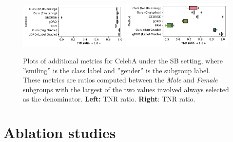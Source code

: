 \begin{figure}[t]
 \includegraphics[width=0.49\textwidth]{supmatch/figures/celeba/no_unsmiling_males/celeba_gender_smiling_tprr.pdf}
 \includegraphics[width=0.49\textwidth]{supmatch/figures/celeba/no_unsmiling_males/celeba_gender_smiling_tnrr.pdf}
 \caption{%
   Plots of additional metrics for CelebA under the SB setting, where ''smiling'' is the class
 label and ''gender'' is the subgroup label. These metrics are ratios computed between the
\emph{Male} and \emph{Female} subgroups with the largest of the two values involved always selected
as the denominator. \textbf{Left:} TNR ratio. \textbf{Right}: TNR ratio. }%
 \label{fig:celeba-gender-smiling-add}
\end{figure}

\section{Ablation studies}\label{sec:sm-ablations}
